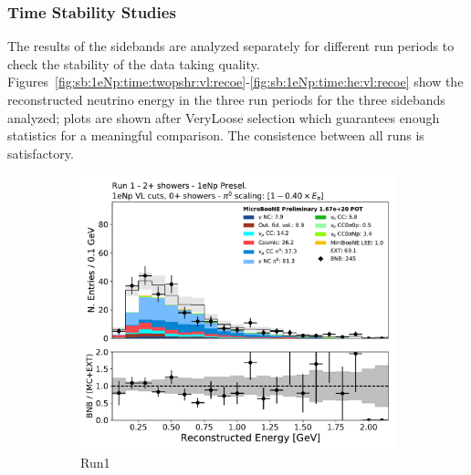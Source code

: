 \subsubsection{Time Stability Studies}

The results of the \npsel sidebands are analyzed separately for different run periods to check the stability of the data taking quality. Figures~\ref{fig:sb:1eNp:time:twopshr:vl:recoe}-\ref{fig:sb:1eNp:time:he:vl:recoe} show the reconstructed neutrino energy in the three run periods for the three sidebands analyzed; plots are shown after VeryLoose selection which guarantees enough statistics for a meaningful comparison. The consistence between all runs is satisfactory.

\begin{figure}[H]
    \begin{center}
    \begin{subfigure}{0.32\textwidth}
    \includegraphics[width=1.00\textwidth]{Sidebands/Figures/1eNp/TimeDependence/reco_e_TwoPShr_NPVL_Run1.pdf}
    \caption{Run1}
    \end{subfigure}
    \begin{subfigure}{0.32\textwidth}

\end{subfigure}
\end{center}
\end{figure}
